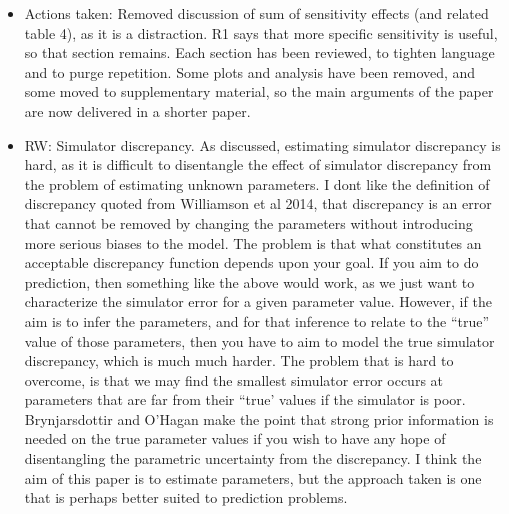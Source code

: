 \documentclass[esd, manuscript]{copernicus}
\begin{document}
\begin{itemize}
\item{Actions taken: Removed discussion of sum of sensitivity effects (and related table 4), as it is a distraction. R1 says that more specific sensitivity is useful, so that section remains. Each section has been reviewed, to tighten language and to purge repetition. Some plots and analysis have been removed, and some moved to supplementary material, so the main arguments of the paper are now delivered in a shorter paper.}

\item{RW: Simulator discrepancy. As discussed, estimating simulator discrepancy is hard, as it is difficult to disentangle the effect of simulator discrepancy from the problem of estimating unknown parameters. I dont like the definition of discrepancy quoted from Williamson et al 2014, that discrepancy is an error that cannot be removed by changing the parameters without introducing more serious biases to the model. The problem is that what constitutes an acceptable discrepancy function depends upon your goal. If you aim to do prediction, then something like the above would work, as we just want to characterize the simulator error for a given parameter value. However, if the aim is to infer the parameters, and for that inference to relate to the ``true'' value of those parameters, then you have to aim to model the true simulator discrepancy, which is much much harder. The problem that is hard to overcome, is that we may find the smallest simulator error occurs at parameters that are far from their ``true' values if the simulator is poor. Brynjarsdottir and O'Hagan make the point that strong prior information is needed on the true parameter values if you wish to have any hope of disentangling the parametric uncertainty from the discrepancy. I think the aim of this paper is to estimate parameters, but the approach taken is one that is perhaps better suited to prediction problems.

}
\end{itemize}
\end{document}
